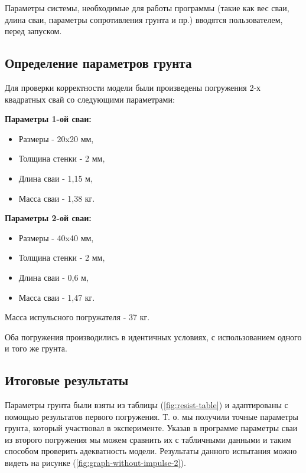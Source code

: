 \noindent Параметры системы, необходимые для работы программы (такие как вес сваи, длина сваи, параметры сопротивления грунта
и пр.) вводятся пользователем, перед запуском.

\subsection{Определение параметров грунта}

Для проверки корректности модели были произведены погружения 2-х квадратных свай со следующими параметрами:

\vspace{1em}

\begin{minipage}{0.5\textwidth}
    \textbf{Параметры 1-ой сваи:}
    \begin{itemize}
        \item Размеры - 20x20 мм,
        \item Толщина стенки - 2 мм,
        \item Длина сваи - 1,15 м,
        \item Масса сваи - 1,38 кг.
    \end{itemize}
\end{minipage}
\hfill
\begin{minipage}{0.5\textwidth}
    \textbf{Параметры 2-ой сваи:}
    \begin{itemize}
        \item Размеры - 40x40 мм,
        \item Толщина стенки - 2 мм,
        \item Длина сваи - 0,6 м,
        \item Масса сваи - 1,47 кг.
    \end{itemize}
\end{minipage}

\noindent Масса испульсного погружателя - 37 кг.

Оба погружения производились в идентичных условиях, с использованием одного и того же грунта.

\subsection{Итоговые результаты}

Параметры грунта были взяты из таблицы (\ref{fig:resist-table}) и адаптированы с помощью результатов первого погружения. Т. о.
мы получили точные параметры грунта, который участвовал в эксперименте. Указав в программе параметры сваи
из второго погружения мы можем сравнить их с табличными данными и таким способом проверить адекватность
модели. Результаты данного испытания можно видеть на рисунке (\ref{fig:graph-without-impulse-2}).

